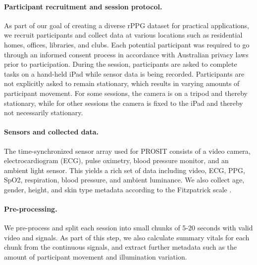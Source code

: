 \documentclass{article}
\begin{document}
\paragraph{Participant recruitment and session protocol.} 
As part of our goal of creating a diverse rPPG dataset for practical applications, we recruit participants and collect data at various locations such as residential homes, offices, libraries, and clubs.
Each potential participant was required to go through an informed consent process in accordance with Australian privacy laws prior to participation.
During the session, participants are asked to complete tasks on a hand-held iPad while sensor data is being recorded.
Participants are not explicitly asked to remain stationary, which results in varying amounts of participant movement.
For some sessions, the camera is on a tripod and thereby stationary, while for other sessions the camera is fixed to the iPad and thereby not necessarily stationary.

\paragraph{Sensors and collected data.}
The time-synchronized sensor array used for PROSIT consists of a video camera, electrocardiogram (ECG), pulse oximetry, blood pressure monitor, and an ambient light sensor.
This yields a rich set of data including video, ECG, PPG, SpO2, respiration, blood pressure, and ambient luminance.
We also collect age, gender, height, and skin type metadata according to the Fitzpatrick scale \cite{fitzpatrick1975soleil}.

\paragraph{Pre-processing.}
We pre-process and split each session into small chunks of 5-20 seconds with valid video and signals.
As part of this step, we also calculate summary vitals for each chunk from the continuous signals, and extract further metadata such as the amount of participant movement and illumination variation.
\end{document}
